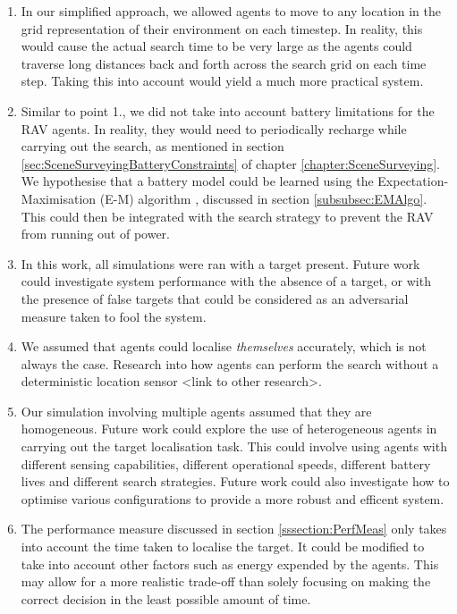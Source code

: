 \begin{enumerate}
    \item In our simplified approach, we allowed agents to move to any location in the grid representation of their environment on each timestep. In reality, this would cause the actual search time to be very large as the agents could traverse long distances back and forth across the search grid on each time step. Taking this into account would yield a much more practical system.
    \item Similar to point 1., we did not take into account battery limitations for the RAV agents. In reality, they would need to periodically recharge while carrying out the search, as mentioned in section \ref{sec:SceneSurveyingBatteryConstraints} of chapter \ref{chapter:SceneSurveying}. We hypothesise that a battery model could be learned using the Expectation-Maximisation (E-M) algorithm \cite{Dempster1977MaximumAlgorithm}, discussed in section \ref{subsubsec:EMAlgo}. This could then be integrated with the search strategy to prevent the RAV from running out of power.
    \item In this work, all simulations were ran with a target present. Future work could investigate system performance with the absence of a target, or with the presence of false targets that could be considered as an adversarial measure taken to fool the system.
    \item We assumed that agents could localise \textit{themselves} accurately, which is not always the case. Research into how agents can perform the search without a deterministic location sensor <link to other research>.
    \item Our simulation involving multiple agents assumed that they are homogeneous. Future work could explore the use of heterogeneous agents in carrying out the target localisation task. This could involve using agents with different sensing capabilities, different operational speeds, different battery lives and different search strategies. Future work could also investigate how to optimise various configurations to provide a more robust and efficent system.
    \item The performance measure discussed in section \ref{sssection:PerfMeas} only takes into account the time taken to localise the target. It could be modified to take into account other factors such as energy expended by the agents. This may allow for a more realistic trade-off than solely focusing on making the correct decision in the least possible amount of time.

\end{enumerate}
